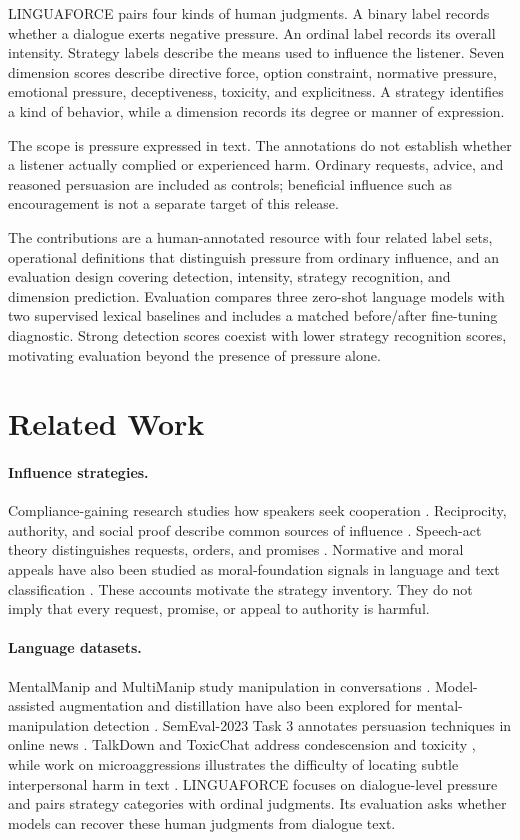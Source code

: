 \documentclass[11pt]{article}
\newcommand{\LNGF}{LINGUAFORCE}
\begin{document}
\LNGF{} pairs four kinds of human judgments. A binary label records whether
a dialogue exerts negative pressure. An ordinal label records its overall
intensity. Strategy labels describe the means used to influence the listener.
Seven dimension scores describe directive force, option constraint, normative
pressure, emotional pressure, deceptiveness, toxicity, and explicitness.
A strategy identifies a kind of behavior, while a dimension records its
degree or manner of expression.

The scope is pressure expressed in text. The annotations do not establish
whether a listener actually complied or experienced harm. Ordinary requests,
advice, and reasoned persuasion are included as controls; beneficial influence
such as encouragement is not a separate target of this release.

The contributions are a human-annotated resource with four related label
sets, operational definitions that distinguish pressure from ordinary
influence, and an evaluation design covering detection, intensity, strategy
recognition, and dimension prediction. Evaluation compares three zero-shot
language models with two supervised lexical baselines and includes a matched
before/after fine-tuning diagnostic. Strong detection scores coexist with
lower strategy recognition scores, motivating evaluation beyond the presence
of pressure alone.

\section{Related Work}
\paragraph{Influence strategies.}
Compliance-gaining research studies how speakers seek cooperation
\citep{marwell1967,wiseman1981}. Reciprocity, authority, and social proof
describe common sources of influence \citep{cialdini1984}. Speech-act theory
distinguishes requests, orders, and promises \citep{austin1962,searle1969}.
Normative and moral appeals have also been studied as moral-foundation
signals in language and text classification \citep{graham2009,johnson2018}.
These accounts motivate the strategy inventory. They do not imply that every
request, promise, or appeal to authority is harmful.

\paragraph{Language datasets.}
MentalManip and MultiManip study manipulation in conversations
\citep{mentalmanip,multimanip}. Model-assisted augmentation and distillation
have also been explored for mental-manipulation detection
\citep{reament}. SemEval-2023 Task 3 annotates persuasion techniques in
online news \citep{piskorski2023}. TalkDown and ToxicChat address
condescension and toxicity \citep{talkdown2023,toxicchat2023}, while work on
microaggressions illustrates the difficulty of locating subtle interpersonal
harm in text \citep{breitfeller2019}.
\LNGF{} focuses on dialogue-level pressure and pairs strategy categories
with ordinal judgments. Its evaluation asks whether models can recover
these human judgments from dialogue text.
\end{document}
